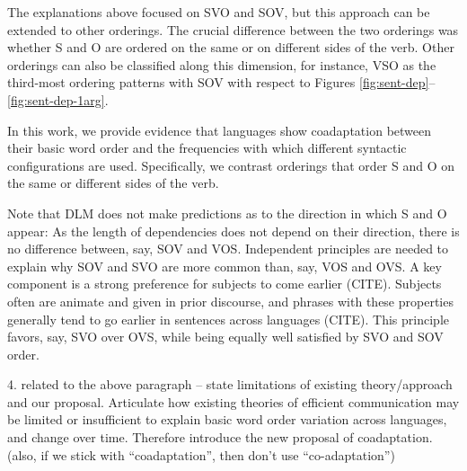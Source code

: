 \documentclass[11pt,a4paper]{article}
\newcommand\mhahn[1]{{\color{red}(#1)}}
\begin{document}
The explanations above focused on SVO and SOV, but this approach can be extended to other orderings.
The crucial difference between the two orderings was whether S and O are ordered on the same or on different sides of the verb.
Other orderings can also be classified along this dimension, for instance, VSO as the third-most ordering patterns with SOV with respect to Figures \ref{fig:sent-dep}--\ref{fig:sent-dep-1arg}.

In this work, we provide evidence that languages show coadaptation between their basic word order and the frequencies with which different syntactic configurations are used.
Specifically, we contrast orderings that order S and O on the same or different sides of the verb.

Note that DLM does not make predictions as to the direction in which S and O appear: As the length of dependencies does not depend on their direction, there is no difference between, say, SOV and VOS.
Independent principles are needed to explain why SOV and SVO are more common than, say, VOS and OVS.
A key component is a strong preference for subjects to come earlier (CITE).
Subjects often are animate and given in prior discourse, and phrases with these properties generally tend to go earlier in sentences across languages (CITE).
This principle favors, say, SVO over OVS, while being equally well satisfied by SVO and SOV order.





{\color{blue}4. related to the above paragraph -- state limitations of existing theory/approach and our proposal. Articulate how existing theories of efficient communication may be limited or insufficient to explain basic word order variation across languages, and change over time. Therefore introduce the new proposal of coadaptation. (also, if we stick with ``coadaptation'', then don't use ``co-adaptation'') }





\end{document}
